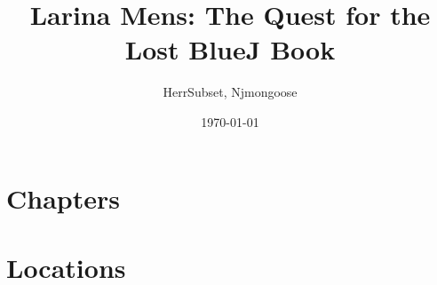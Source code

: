 \documentclass[11pt,a4paper]{article}
\title{Larina Mens: The Quest for the Lost BlueJ Book}
\date{\today}
\author{HerrSubset, Njmongoose}
\begin{document}
\maketitle
\newpage
\tableofcontents
\newpage

\part{Chapters}



\part{Locations}

\end{document}
